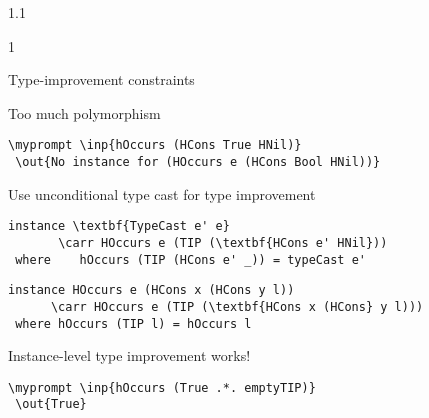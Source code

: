 \documentclass{slides}
\newenvironment{myslide}{\begin{slide}\color{Blue}\begin{boxedminipage}{1.1\hsize}\begin{boxedminipage}{1\hsize}\color{Black}
\vspace{-170\in}
}{%
\smallskip
\end{boxedminipage}
\end{boxedminipage}
\end{slide}}
\newenvironment{myslide}{\begin{slide}
}{%
\end{slide}}
\newenvironment{myslide}{\begin{slide}\color{White}\begin{boxedminipage}{1.1\hsize}\color{Black}
\vspace{-170\in}
}{%
\smallskip
\end{boxedminipage}
\end{slide}}
\newcommand{\header}[1]{{\large \color{Red} #1}}
\newcommand{\inp}[1]{{\color{Brown} \mytextbf{#1}}}
\newcommand{\out}[1]{{\color{Black} \mytextbf{#1}}}
\newcommand{\blau}[1]{{\vspace{-50\in}\normalsize \color{Blue} #1}}
\newcommand{\carr}{\ensuremath{\Rightarrow}}
\newcommand{\myprompt}{ghci\ensuremath{>}}
\newcommand{\mytextbf}[1]{\texttt{\textbf{#1}}}
\begin{document}
\begin{myslide}

\header{Type-improvement constraints}

\vspace{-77\in}

\blau{Too much polymorphism}

\smallskip

\begin{Verbatim}[fontfamily=courier,fontsize=\small,commandchars=\\\{\}]
 \myprompt \inp{hOccurs (HCons True HNil)}
 \out{No instance for (HOccurs e (HCons Bool HNil))}
\end{Verbatim}

\vspace{-77\in}

\blau{Use unconditional type cast for type improvement}

\smallskip

\begin{Verbatim}[fontfamily=courier,fontsize=\tiny,commandchars=\\\{\}]
 instance \textbf{TypeCast e' e}
       \carr HOccurs e (TIP (\textbf{HCons e' HNil}))
 where    hOccurs (TIP (HCons e' _)) = typeCast e'
\end{Verbatim}
\smallskip
\begin{Verbatim}[fontfamily=courier,fontsize=\tiny,commandchars=\\\{\}]
instance HOccurs e (HCons x (HCons y l))
      \carr HOccurs e (TIP (\textbf{HCons x (HCons} y l)))
 where hOccurs (TIP l) = hOccurs l
\end{Verbatim}

\vspace{-77\in}

\blau{Instance-level type improvement works!}

\smallskip

\begin{Verbatim}[fontfamily=courier,fontsize=\small,commandchars=\\\{\}]
 \myprompt \inp{hOccurs (True .*. emptyTIP)}
 \out{True}
\end{Verbatim}

\end{myslide}



\end{document}
